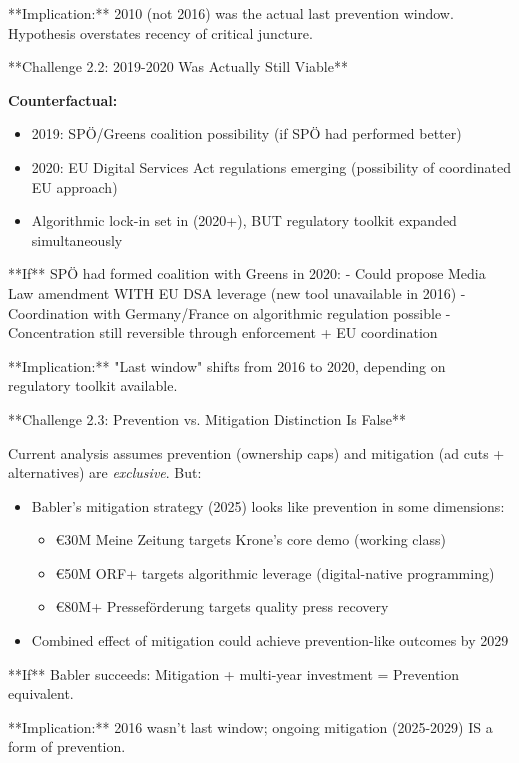 **Implication:** 2010 (not 2016) was the actual last prevention window. Hypothesis overstates recency of critical juncture.

**Challenge 2.2: 2019-2020 Was Actually Still Viable**

\textbf{Counterfactual:}
\begin{itemize}
\item 2019: SPÖ/Greens coalition possibility (if SPÖ had performed better)
\item 2020: EU Digital Services Act regulations emerging (possibility of coordinated EU approach)
\item Algorithmic lock-in set in (2020+), BUT regulatory toolkit expanded simultaneously
\end{itemize}

**If** SPÖ had formed coalition with Greens in 2020:
- Could propose Media Law amendment WITH EU DSA leverage (new tool unavailable in 2016)
- Coordination with Germany/France on algorithmic regulation possible
- Concentration still reversible through enforcement + EU coordination

**Implication:** "Last window" shifts from 2016 to 2020, depending on regulatory toolkit available.

**Challenge 2.3: Prevention vs. Mitigation Distinction Is False**

Current analysis assumes prevention (ownership caps) and mitigation (ad cuts + alternatives) are \textit{exclusive}. But:

\begin{itemize}
\item Babler's mitigation strategy (2025) looks like prevention in some dimensions:
  \begin{itemize}
  \item €30M Meine Zeitung targets Krone's core demo (working class)
  \item €50M ORF+ targets algorithmic leverage (digital-native programming)
  \item €80M+ Presseförderung targets quality press recovery
  \end{itemize}
\item Combined effect of mitigation could achieve prevention-like outcomes by 2029
\end{itemize}

**If** Babler succeeds: Mitigation + multi-year investment = Prevention equivalent.

**Implication:** 2016 wasn't last window; ongoing mitigation (2025-2029) IS a form of prevention.

